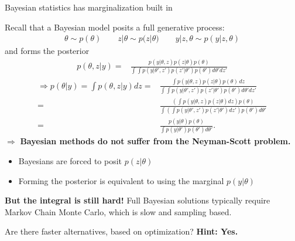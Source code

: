 \begin{frame}{Bayesian statistics has marginalization built in}


Recall that a Bayesian model posits a full generative process:
%
\begin{align*}
%
\theta \sim{} p(\theta) \quad\quad
z | \theta \sim{} p(z | \theta) \quad\quad
y | z, \theta \sim{} p(y | z, \theta)
%
\end{align*}
%
and forms the posterior
%
\begin{align*}
%
p(\theta, z \vert y) ={}& \frac{p(y | \theta, z) p(z | \theta) p(\theta)}
     {\int \int p(y | \theta', z') p(z' | \theta') p(\theta') d\theta' dz'}
 \end{align*}
%
\pause
%
\begin{align*}
\Rightarrow
 p(\theta \vert y) = \int p(\theta, z \vert y) dz
 ={}& \frac{\int p(y | \theta, z) p(z | \theta) p(\theta) \, dz}
      {\int\int p(y | \theta', z') p(z' | \theta') p(\theta') d\theta' dz'} \\
={}& \frac{\left(\int p(y | \theta, z) p(z | \theta)dz \right) p(\theta) }
   {\int\left( \int p(y | \theta', z') p(z' | \theta')dz'\right) p(\theta') d\theta' } \\
={}& \frac{ p(y | \theta) p(\theta) }
  { \int p(y | \theta') p(\theta') d\theta'}.
%
\end{align*}
%
\pause
$\Rightarrow$
\textbf{Bayesian methods do not suffer from the Neyman-Scott problem.}

\begin{itemize}
    \item Bayesians are forced to posit $p(z | \theta)$
    \item Forming the posterior is equivalent to using the marginal $p(y | \theta)$
\end{itemize}

\pause
\textbf{But the integral is still hard!}
%
Full Bayesian solutions typically require Markov Chain Monte Carlo, which is
slow and sampling based.

Are there faster alternatives, based on optimization?  \textbf{Hint: Yes.}

\end{frame}



